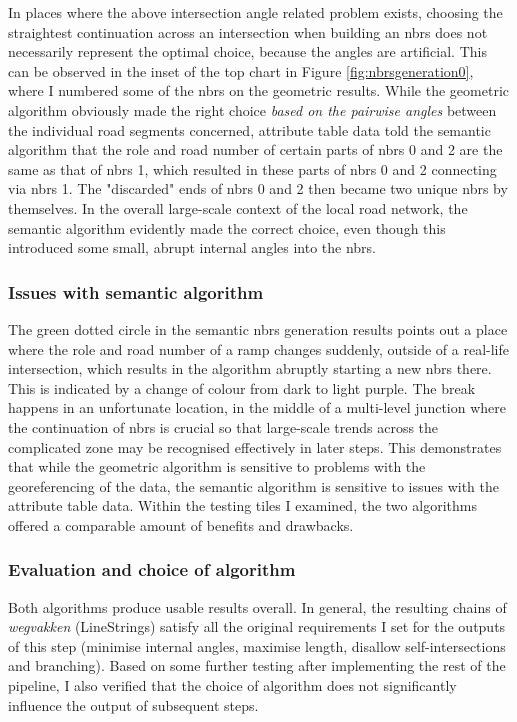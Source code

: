 In places where the above intersection angle related problem exists, choosing the straightest continuation across an intersection when building an \ac{nbrs} does not necessarily represent the optimal choice, because the angles are artificial. This can be observed in the inset of the top chart in Figure \ref{fig:nbrsgeneration0}, where I numbered some of the \ac{nbrs} on the geometric results. While the geometric algorithm obviously made the right choice \textit{based on the pairwise angles} between the individual road segments concerned, attribute table data told the semantic algorithm that the role and road number of certain parts of \ac{nbrs} 0 and 2 are the same as that of \ac{nbrs} 1, which resulted in these parts of \ac{nbrs} 0 and 2 connecting via \ac{nbrs} 1. The "discarded" ends of \ac{nbrs} 0 and 2 then became two unique \ac{nbrs} by themselves. In the overall large-scale context of the local road network, the semantic algorithm evidently made the correct choice, even though this introduced some small, abrupt internal angles into the \ac{nbrs}.

\subsubsection{Issues with semantic algorithm}

The green dotted circle in the semantic \ac{nbrs} generation results points out a place where the role and road number of a ramp changes suddenly, outside of a real-life intersection, which results in the algorithm abruptly starting a new \ac{nbrs} there. This is indicated by a change of colour from dark to light purple. The break happens in an unfortunate location, in the middle of a multi-level junction where the continuation of \ac{nbrs} is crucial so that large-scale trends across the complicated zone may be recognised effectively in later steps. This demonstrates that while the geometric algorithm is sensitive to problems with the georeferencing of the data, the semantic algorithm is sensitive to issues with the attribute table data. Within the testing tiles I examined, the two algorithms offered a comparable amount of benefits and drawbacks.

\subsubsection{Evaluation and choice of algorithm}

Both algorithms produce usable results overall. In general, the resulting chains of \textit{wegvakken} (LineStrings) satisfy all the original requirements I set for the outputs of this step (minimise internal angles, maximise length, disallow self-intersections and branching). Based on some further testing after implementing the rest of the pipeline, I also verified that the choice of algorithm does not significantly influence the output of subsequent steps.

